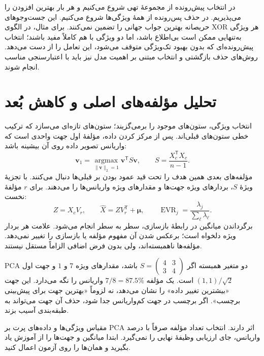 در انتخاب پیش‌رونده از مجموعهٔ تهی شروع می‌کنیم و هر بار بهترین افزودن را می‌پذیریم. در حذف پس‌رونده از همهٔ ویژگی‌ها شروع می‌کنیم. این جست‌وجوهای حریصانه بهترین جواب جهانی را تضمین نمی‌کنند. برای مثال، در الگوی XOR هر ویژگی به‌تنهایی ممکن است بی‌اطلاع باشد، اما دو ویژگی با هم کاملاً مفید باشند؛ انتخاب پیش‌رونده‌ای که بدون بهبود تک‌ویژگی متوقف می‌شود، این تعامل را از دست می‌دهد. روش‌های حذف بازگشتی و انتخاب مبتنی بر اهمیت مدل نیز باید با اعتبارسنجی مناسب انجام شوند.

\section{تحلیل مؤلفه‌های اصلی و کاهش بُعد}
انتخاب ویژگی، ستون‌های موجود را برمی‌گزیند؛  ستون‌های تازه‌ای می‌سازد که ترکیب خطی ستون‌های قبلی‌اند. پس از مرکز کردن داده، مؤلفهٔ اول جهت واحدی است که واریانس تصویر داده روی آن بیشینه باشد:
\[\mathbf v_1=\underset{\|\mathbf v\|_2=1}{\operatorname{argmax}}\mathbf v^\mathsf T S\mathbf v,\qquad S=\frac{X_c^\mathsf T X_c}{n-1}.\]
مؤلفه‌های بعدی همین هدف را تحت قید عمود بودن بر قبلی‌ها دنبال می‌کنند. با تجزیهٔ ویژهٔ $S$، بردارهای ویژه جهت‌ها و مقدارهای ویژه واریانس‌ها را می‌دهند. برای $r$ مؤلفهٔ نخست:
\[Z=X_cV_r,\qquad \widehat X=ZV_r^\mathsf T+\boldsymbol\mu,\qquad \operatorname{EVR}_j=\frac{\lambda_j}{\sum_\ell\lambda_\ell}.\]
برگرداندن میانگین در رابطهٔ بازسازی، سطر به سطر انجام می‌شود. علامت هر بردار ویژه دلخواه است؛ برعکس شدن آن مفهوم مؤلفه یا بازسازی را تغییر نمی‌دهد. مؤلفه‌ها ناهمبسته‌اند، ولی بدون فرض اضافی الزاماً مستقل نیستند.

\begin{example}{PCA دو متغیر همبسته}
اگر $S=\left(\begin{smallmatrix}4&3\\3&4\end{smallmatrix}\right)$ باشد، مقدارهای ویژه $7$ و $1$ و جهت اول $(1,1)/\sqrt2$ است. یک مؤلفه $7/8=87.5\%$ واریانس را نگه می‌دارد. این جهت «بیشترین تغییر داده» را نشان می‌دهد، نه لزوماً «بهترین جهت برای پیش‌بینی برچسب». اگر برچسب در جهت کم‌واریانس جدا شود، حذف آن جهت می‌تواند به طبقه‌بندی آسیب بزند.
\end{example}

مقیاس ویژگی‌ها و داده‌های پرت بر PCA اثر دارند. انتخاب تعداد مؤلفه صرفاً با درصد واریانس، جای ارزیابی وظیفهٔ نهایی را نمی‌گیرد. ابتدا میانگین و جهت‌ها را از آموزش یاد بگیرید و همان‌ها را روی آزمون اعمال کنید.

